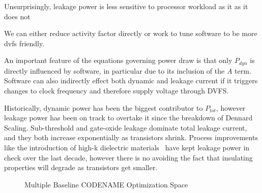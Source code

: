 Unsurprisingly, leakage power is less sensitive to processor workload as it as it does not 


We can either reduce activity factor directly or work to tune software to be more dvfs friendly.






An important feature of the equations governing power draw is that only $P_{dyn}$ is directly influenced by software, in particular due to its inclusion of the $A$ term. Software can also indirectly effect both dynamic and leakage current if it triggers changes to clock frequency and therefore supply voltage through DVFS.  

Historically, dynamic power has been the biggest contributor to $P_{tot}$, however leakage power has been on track to overtake it since the breakdown of Dennard Scaling.  Sub-threshold and gate-oxide leakage dominate total leakage current, and they both increase exponentially as transistors shrink. Process improvements like the introduction of high-k dielectric materials~\cite{jan:2009aa} have kept leakage power in check over the last decade, however there is no avoiding the fact that insulating properties will degrade as transistors get smaller.

\begin{figure}
\centering

\caption{Multiple Baseline CODENAME Optimization Space}
\label{fig:multibaseline-investigation}
\end{figure}

